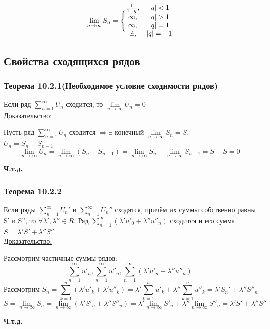\documentclass[12pt]{article}
\let\oldsum\sum
\let\oldlim\lim
\renewcommand{\sum}{\oldsum\limits}
\renewcommand{\lim}{\oldlim\limits}
\begin{document}
  \[\lim_{n \to \infty} S_n =\Bigg\{ 
    \begin{matrix}
      \frac{1}{1-q}, & |q|<1\\
      \infty, & |q|>1\\
      \infty, & |q|=1\\
      \not \exists, & |q|=-1
    \end{matrix}\]



  \subsection{Свойства сходящихся рядов}
  \subsubsection*{Теорема 10.2.1(Необходимое условие сходимости рядов)}\label{th:10.2.1}
  \par\noindent
  Если ряд $\sum_{n=1}^{\infty} U_n$ сходится, то $\lim_{n \to \infty} U_n =0$\\
  \underline{Доказательство:}
  \begin{adjustwidth}{1.5em}{1.5em}
    Пусть ряд $\sum_{n=1}^{\infty} U_n$ сходится $\Rightarrow \exists$ конечный $\lim_{n \to \infty} S_n =S$.\\
     $U_n=S_n-S_{n-1}$
    \[\lim_{n \to \infty} U_n = \lim_{n \to \infty} (S_n - S_{n-1}) = \lim_{n \to \infty} S_n - \lim_{n \to \infty} S_{n-1} = S-S = 0\]
  \end{adjustwidth}
  \begin{center}
    \textbf{Ч.т.д.}
  \end{center}
  \subsubsection*{Теорема 10.2.2}\label{th:10.2.2}
  \par\noindent
  Если ряды $\sum_{n=1}^{\infty} U_n' $ и $\sum_{n=1}^{\infty} U_n''$ сходятся, причём их суммы собственно равны S' и S'',
  то $\forall \lambda',\lambda'' \in R$. Ряд $\sum^{\infty}_{n=1}(\lambda' u'_0+\lambda''u''_n)$ сходится и его
  сумма $S=\lambda'S'+\lambda''S''$\\
  \underline{Доказательство:}
  \begin{adjustwidth}{1.5em}{1.5em}
    Рассмотрим частичные суммы рядов:
    \[\sum^{\infty}_{n=1} u'_n, \sum_{n=1}^{\infty}u''_n,\sum_{n=1}^{\infty}(\lambda'u'_n+\lambda''u''_n)\]
    \[\text{Рассмотрим } S_n=
    \sum_{k=1}^{n}(\lambda'u'_k+\lambda'u''_k)=
    \lambda'\sum_{k=1}^{n}u'_k+\lambda''\sum_{k=1}^{n}u''_k=\lambda'S_n'+\lambda''S''_n\]
    \[S=\lim_{n\to \infty} S_n=
    \lim_{n \to \infty}(\lambda'S'_n+\lambda''S''_n)=
    \lambda'\lim_{n\to \infty}S'_n+\lambda''\lim_{n \to \infty}S''_n=\lambda'S'+\lambda''S''\]
  \end{adjustwidth}
  \begin{center}
    \textbf{Ч.т.д.}
  \end{center}
\end{document}

